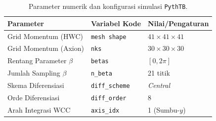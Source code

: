 \begin{table}[htbp]
\centering
\caption{Parameter numerik dan konfigurasi simulasi \texttt{PythTB}.}
\label{tab:param_numerik}
\begin{tabular}{@{}lll@{}}
\toprule
\textbf{Parameter} & \textbf{Variabel Kode} & \textbf{Nilai/Pengaturan} \\ \midrule
Grid Momentum (HWC) & \texttt{mesh shape} & $41 \times 41 \times 41$ \\
Grid Momentum (Axion) & \texttt{nks} & $30 \times 30 \times 30$ \\
Rentang Parameter $\beta$ & \texttt{betas} & $[0, 2\pi]$ \\
Jumlah Sampling $\beta$ & \texttt{n\_beta} & 21 titik \\
Skema Diferensiasi & \texttt{diff\_scheme} & \textit{Central} \\
Orde Diferensiasi & \texttt{diff\_order} & 8 \\
Arah Integrasi WCC & \texttt{axis\_idx} & 1 (Sumbu-$y$) \\ \bottomrule
\end{tabular}
\end{table}

